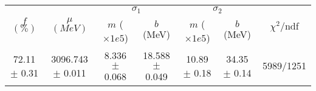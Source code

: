 \begin{tabular}{c|c|cc|cc||c}
 \multirow{2}{*}{$f$ $(\%)$} & \multirow{2}{*}{$\mu$ $(MeV)$} & \multicolumn{2}{|c|}{$\sigma_1$} & \multicolumn{2}{|c||}{$\sigma_2$} & \multirow{2}{*}{$\chi^2/$ndf} \\
 & & $m$ ($\times1e5$) & $b$ (MeV) & $m$ ($\times1e5$) & $b$ (MeV) & \\
\hline
72.11 $\pm$ 0.31 & 3096.743 $\pm$ 0.011 & 8.336 $\pm$ 0.068 & 18.588 $\pm$ 0.049 & 10.89 $\pm$ 0.18 & 34.35 $\pm$ 0.14 & 5989/1251\\
\end{tabular}

